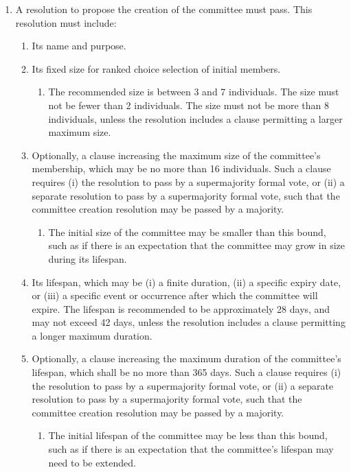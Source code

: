 \documentclass[11pt]{article}
\newcounter{h1}
\newcounter{h2}[h1]
\newcounter{h3}[h2]
\begin{document}
\begin{enumerate}
  \item A resolution to propose the creation of the committee must pass. This resolution must include:  
  \begin{enumerate}
    \item Its name and purpose.  
    \item Its fixed size for ranked choice selection of initial members.  
    \begin{enumerate}
      \item The recommended size is between 3 and 7 individuals. The size must not be fewer than 2 individuals. The size must not be more than 8 individuals, unless the resolution includes a clause permitting a larger maximum size.  
    \end{enumerate}
    \item Optionally, a clause increasing the maximum size of the committee's membership, which may be no more than 16 individuals. Such a clause requires (i) the resolution to pass by a supermajority formal vote, or (ii) a separate resolution to pass by a supermajority formal vote, such that the committee creation resolution may be passed by a majority.  
    \begin{enumerate}
      \item The initial size of the committee may be smaller than this bound, such as if there is an expectation that the committee may grow in size during its lifespan.  
    \end{enumerate}
    \item Its lifespan, which may be (i) a finite duration, (ii) a specific expiry date, or (iii) a specific event or occurrence after which the committee will expire. The lifespan is recommended to be approximately 28 days, and may not exceed 42 days, unless the resolution includes a clause permitting a longer maximum duration.  
    \item Optionally, a clause increasing the maximum duration of the committee's lifespan, which shall be no more than 365 days. Such a clause requires (i) the resolution to pass by a supermajority formal vote, or (ii) a separate resolution to pass by a supermajority formal vote, such that the committee creation resolution may be passed by a majority.  
    \begin{enumerate}
      \item The initial lifespan of the committee may be less than this bound, such as if there is an expectation that the committee's lifespan may need to be extended.  

\end{enumerate}
\end{enumerate}
\end{enumerate}
\end{document}
